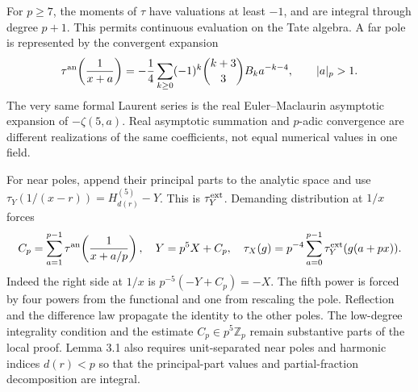 \documentclass[11pt]{article}
\theoremstyle{definition}
\theoremstyle{remark}\newtheorem*{remark}{Remark}
\newcommand{\Z}{\mathbb Z}
\begin{document}
For $p\ge7$, the moments of $\tau$ have valuations at least $-1$, and are
integral through degree $p+1$. This permits continuous evaluation on the Tate
algebra. A far pole is represented by the convergent expansion
\begin{equation}\label{eq:farpole}
 \tau^{\rm an}\!\left(\frac1{x+a}\right)
 =-\frac14\sum_{k\ge0}(-1)^k\binom{k+3}{3}B_k a^{-k-4},
 \qquad |a|_p>1.
\end{equation}
The very same formal Laurent series is the real Euler--Maclaurin asymptotic
expansion of $-\zeta(5,a)$. Real asymptotic summation and $p$-adic convergence
are different realizations of the same coefficients, not equal numerical
values in one field.

For near poles, append their principal parts to the analytic space and use
$\tau_Y(1/(x-r))=H_{d(r)}^{(5)}-Y$. This is $\tau_Y^{\rm ext}$.
Demanding distribution at $1/x$ forces
\begin{equation}\label{eq:param}
 C_p=\sum_{a=1}^{p-1}\tau^{\rm an}\!\left(\frac1{x+a/p}\right),\quad
 Y=p^5X+C_p,\quad
 \tau_X(g)=p^{-4}\sum_{a=0}^{p-1}\tau_Y^{\rm ext}(g(a+px)).
\end{equation}
Indeed the right side at $1/x$ is $p^{-5}(-Y+C_p)=-X$.
The fifth power is forced by four powers from the functional and one from
rescaling the pole. Reflection and the difference law propagate the identity
to the other poles. The low-degree integrality condition and the estimate
$C_p\in p^5\Z_p$ remain substantive parts of the local proof. Lemma 3.1 also
requires unit-separated near poles and harmonic indices $d(r)<p$ so that the
principal-part values and partial-fraction decomposition are integral.
\end{document}

